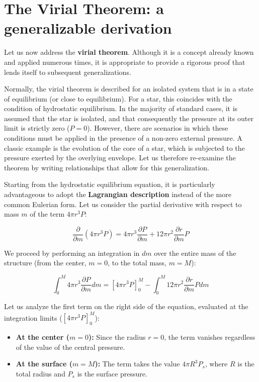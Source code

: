 \section{The Virial Theorem: a generalizable derivation}

Let us now address the \textbf{virial theorem}. Although it is a concept already known and applied numerous times, it is appropriate to provide a rigorous proof that lends itself to subsequent generalizations.

Normally, the virial theorem is described for an isolated system that is in a state of equilibrium (or close to equilibrium). For a star, this coincides with the condition of hydrostatic equilibrium. In the majority of standard cases, it is assumed that the star is isolated, and that consequently the pressure at its outer limit is strictly zero ($P=0$).
However, there are scenarios in which these conditions must be applied in the presence of a non-zero external pressure. A classic example is the evolution of the core of a star, which is subjected to the pressure exerted by the overlying envelope. Let us therefore re-examine the theorem by writing relationships that allow for this generalization.

Starting from the hydrostatic equilibrium equation, it is particularly advantageous to adopt the \textbf{Lagrangian description} instead of the more common Eulerian form.
Let us consider the partial derivative with respect to mass $m$ of the term $4\pi r^3 P$:

\begin{equation}
\frac{\partial}{\partial m} \left( 4\pi r^3 P \right) = 4\pi r^3 \frac{\partial P}{\partial m} + 12\pi r^2 \frac{\partial r}{\partial m} P
\end{equation}

We proceed by performing an integration in $dm$ over the entire mass of the structure (from the center, $m=0$, to the total mass, $m=M$):

\begin{equation}
\int_0^M 4\pi r^3 \frac{\partial P}{\partial m} dm = \left[ 4\pi r^3 P \right]_0^M - \int_0^M 12\pi r^2 \frac{\partial r}{\partial m} P dm
\end{equation}

Let us analyze the first term on the right side of the equation, evaluated at the integration limits ($\left[ 4\pi r^3 P \right]_0^M$):
\begin{itemize}
\item \textbf{At the center ($m=0$):} Since the radius $r=0$, the term vanishes regardless of the value of the central pressure.
\item \textbf{At the surface ($m=M$):} The term takes the value $4\pi R^3 P_s$, where $R$ is the total radius and $P_s$ is the surface pressure.
\end{itemize}

